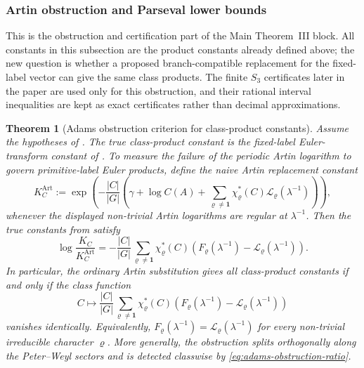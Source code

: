 \documentclass[11pt,a4paper]{amsart}
\theoremstyle{plain}
\newtheorem{theorem}{Theorem}[section]
\theoremstyle{definition}
\theoremstyle{remark}
\begin{document}
\subsubsection{Artin obstruction and Parseval lower bounds}

This is the obstruction and certification part of the Main Theorem~III block.
All constants in this subsection are the product constants already defined
above; the new question is whether a proposed branch-compatible replacement
for the fixed-label vector can give the same class products.  The finite
\(S_3\) certificates later in the paper are used only for this obstruction,
and their rational interval inequalities are kept as exact certificates rather
than decimal approximations.

\begin{theorem}[Adams obstruction criterion for class-product constants]
  \label{thm:adams-obstruction-class-product}
  Assume the hypotheses of . The true
  class-product constant is the fixed-label Euler-transform constant of
  . To measure the failure of the
  periodic Artin logarithm to govern primitive-label Euler products,
  define the naive Artin replacement constant
  \begin{equation}\label{eq:naive-artin-class-product-constant}
    K_C^{\mathrm{Art}}
    :=
    \exp\!\left(
      -\frac{|C|}{|G|}
      \left(
        \gamma+\log C(A)
        +\sum_{\varrho\neq\mathbf1}
          \chi_\varrho^\ast(C)\mathcal L_\varrho(\lambda^{-1})
      \right)
    \right),
  \end{equation}
  whenever the displayed non-trivial Artin logarithms are regular at
  \(\lambda^{-1}\). Then the true constants from
   satisfy
  \begin{equation}\label{eq:adams-obstruction-ratio}
    \log\frac{K_C}{K_C^{\mathrm{Art}}}
    =
    -\frac{|C|}{|G|}
      \sum_{\varrho\neq\mathbf1}
        \chi_\varrho^\ast(C)
        \left(F_\varrho(\lambda^{-1})-
        \mathcal L_\varrho(\lambda^{-1})\right).
  \end{equation}
  In particular, the ordinary Artin substitution gives all class-product
  constants if and only if the class function
  \begin{equation}\label{eq:adams-obstruction-class-function}
    C\longmapsto
    \frac{|C|}{|G|}
      \sum_{\varrho\neq\mathbf1}
        \chi_\varrho^\ast(C)
        \left(F_\varrho(\lambda^{-1})-
        \mathcal L_\varrho(\lambda^{-1})\right)
  \end{equation}
  vanishes identically. Equivalently,
  \(F_\varrho(\lambda^{-1})=\mathcal L_\varrho(\lambda^{-1})\) for every
  non-trivial irreducible character \(\varrho\). More generally, the
  obstruction splits orthogonally along the Peter--Weyl sectors and is
  detected classwise by \eqref{eq:adams-obstruction-ratio}.
\end{theorem}
\end{document}
